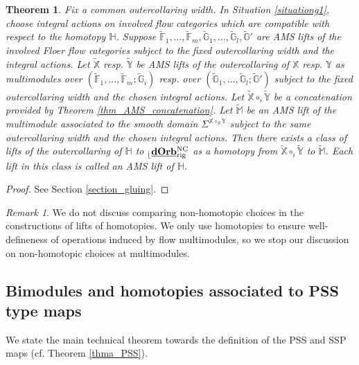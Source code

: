\documentclass[reqno, 10pt]{amsart}
\numberwithin{equation}{section}
\numberwithin{equation}{section}
\newtheorem{thma}{Theorem}
\theoremstyle{definition}
\theoremstyle{remark}
\newtheorem{rem}[thm]{Remark}
\newcommand{\mb}{\mathbb}
\renewcommand{\outer}{{}_{\lfloor}}
\newcommand{\uds}[1]{\underline{\smash{#1}}}
\begin{document}
\begin{thma}\label{thma_multimodule_gluing}
Fix a common outercollaring width. In Situation \ref{situationg1}, choose integral actions on involved flow categories which are compatible with respect to the homotopy ${\mb H}$. Suppose $\tilde{\mb F}_1, \ldots, \tilde {\mb F}_m,  \tilde {\mb G}_1, \ldots, \tilde {\mb G}_l, \tilde {\mb G}'$ are AMS lifts of the involved Floer flow categories subject to the fixed outercollaring width and the integral actions. Let $\tilde{\mb X}$ resp. $\tilde {\mb Y}$ be AMS lifts of the outercollaring of ${\mb X}$ resp. ${\mb Y}$ as multimodules over $(\tilde{\mb F}_1, \ldots, \tilde{\mb F}_m; \tilde{\mb G}_i)$ resp. over $( \tilde {\mb G}_1, \ldots, \tilde {\mb G}_l; \tilde {\mb G}')$ subject to the fixed outercollaring width and the chosen integral actions. Let $\tilde {\mb X} \circ_i \tilde {\mb Y}$ be a concatenation provided by Theorem \ref{thm_AMS_concatenation}. Let $\tilde {\mb M}$ be an AMS lift of the multimodule associated to the smooth domain $\Sigma^{{\mb X} \circ_S {\mb Y}}$ subject to the same outercollaring width and the chosen integral actions. Then there exists a class of lifts of the outercollaring of ${\mb H}$ to $\outer \uds{\bf dOrb}^{\rm NC}_{\rm rig}$ as a homotopy from $\tilde{\mb X} \circ_i \tilde {\mb Y}$ to $\tilde {\mb M}$. Each lift in this class is called an AMS lift of ${\mb H}$.
\end{thma}

\begin{proof}
See Section \ref{section_gluing}.
\end{proof}

\begin{rem}
    We do not discuss comparing non-homotopic choices in the constructions of lifts of homotopies. We only use homotopies to ensure well-defineness of operations induced by flow multimodules, so we stop our discussion on non-homotopic choices at multimodules.
\end{rem}







\subsection{Bimodules and homotopies associated to PSS type maps}

We state the main technical theorem towards the definition of the PSS and SSP maps (cf. Theorem \ref{thma_PSS}). 
\end{document}
